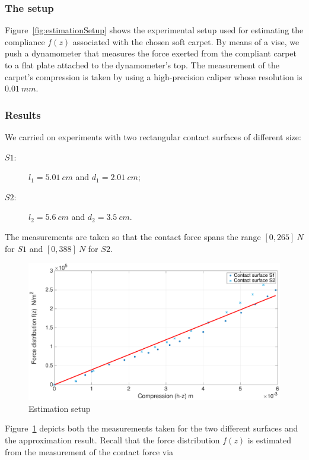 \documentclass[12pt,a4paper,twoside]{article}
\begin{document}
\subsubsection{The setup}
Figure~\ref{fig:estimationSetup} shows the experimental setup used for estimating the compliance $f(z)$ associated with the chosen soft carpet. 
By means of a vise, we push a dynamometer that measures the force exerted from the compliant carpet to a flat plate attached to the  dynamometer's top.
The measurement of the carpet's compression is taken by using a high-precision caliper whose resolution is $0.01 \ mm$.

\subsubsection{Results}
We carried on experiments with two rectangular contact surfaces of different size:
\begin{description}
  \item[$S1:$] $l_1 = 5.01 \ cm$ and $d_1 = 2.01 \ cm$;
  \item[$S2:$] $l_2 = 5.6 \ cm$ and $d_2 = 3.5 \ cm$.
\end{description}
The measurements are taken so that the contact force spans the range $[0,265] \ N$ for $S1$ and $[0,388] \ N$ for $S2$.
\begin{figure}[t]
    \begin{center}
\includegraphics[width=\linewidth]{images/estimationTests.eps}    \caption{Estimation setup}
    \label{fig:estimationResults}
    \end{center}
\end{figure}
Figure~\ref{fig:estimationResults} depicts both the measurements taken  for the two different surfaces and the approximation result. Recall that the force distribution $f(z)$ is estimated from the measurement of the contact force via  
\end{document}
